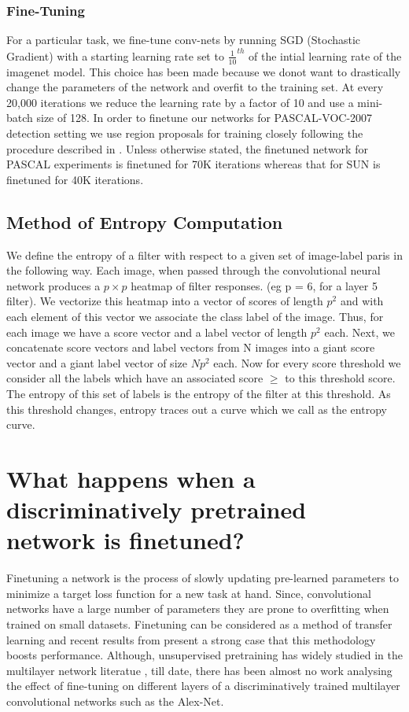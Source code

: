 \documentclass[runningheads]{llncs}
\begin{document}
\subsubsection{Fine-Tuning}
\label{sub:fine-train}
For a particular task, we fine-tune conv-nets by running SGD (Stochastic Gradient) with a starting learning rate set to $\frac{1}{10}^{th}$ of the intial learning rate of the imagenet model. This choice has been made because we donot want to drastically change the parameters of the network and overfit to the training set. At every 20,000 iterations we reduce the learning rate by a factor of 10 and use a mini-batch size of 128. In order to finetune our networks for PASCAL-VOC-2007 detection setting we use region proposals for training closely following the procedure described in \cite{Rcnn}. Unless otherwise stated, the finetuned network for PASCAL experiments is finetuned for 70K iterations whereas that for SUN is finetuned for 40K iterations.

\subsection{Method of Entropy Computation}
\label{sub:def-ent}
We define the entropy of a filter with respect to a given set of image-label paris in the following way. Each image, when passed through the convolutional neural network produces a $p \times p$ heatmap of filter responses. (eg p = 6, for a layer 5 filter). We vectorize this heatmap into a vector of scores of length $p^2$ and with each element of this vector we associate the class label of the image. Thus, for each image we have a score vector and a label vector of length $p^2$ each. Next, we concatenate score vectors and label vectors from N images into a giant score vector and a giant label vector  of size $Np^2$ each. Now for every score threshold we consider all the labels which have an associated score $\geq$ to this threshold score. The entropy of this set of labels is the entropy of the filter at this threshold. As this threshold changes, entropy traces out a curve which we call as the entropy curve.  


\section{What happens when a discriminatively pretrained network is finetuned?}
\label{sec:fine}
Finetuning a network is the process of slowly updating pre-learned parameters to minimize a target loss function for a new task at hand. Since, convolutional networks have a large number of parameters they are prone to overfitting when trained on small datasets. Finetuning can be considered as a method of transfer learning and recent results from \cite{Rcnn}\cite{Decaf} present a strong case that this methodology boosts performance. Although, unsupervised pretraining has widely studied in the multilayer network literatue \cite{HintonPre}\cite{DeepPre}, till date, there has been almost no work analysing the effect of fine-tuning on different layers of a discriminatively trained multilayer convolutional networks such as the Alex-Net.
\end{document}
